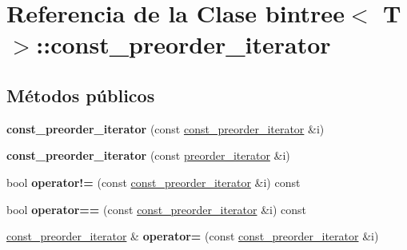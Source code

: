 \hypertarget{classbintree_1_1const__preorder__iterator}{}\section{Referencia de la Clase bintree$<$ T $>$\+:\+:const\+\_\+preorder\+\_\+iterator}
\label{classbintree_1_1const__preorder__iterator}
\subsection*{Métodos públicos}
\begin{DoxyCompactItemize}
\item 
{\bfseries const\+\_\+preorder\+\_\+iterator} (const \hyperlink{classbintree_1_1const__preorder__iterator}{const\+\_\+preorder\+\_\+iterator} \&i)\hypertarget{classbintree_1_1const__preorder__iterator_ad7e733eae6ff3c15876789e0a3ea5728}{}\label{classbintree_1_1const__preorder__iterator_ad7e733eae6ff3c15876789e0a3ea5728}

\item 
{\bfseries const\+\_\+preorder\+\_\+iterator} (const \hyperlink{classbintree_1_1preorder__iterator}{preorder\+\_\+iterator} \&i)\hypertarget{classbintree_1_1const__preorder__iterator_af32632713d464a9fbfa6d7bebc7e4d05}{}\label{classbintree_1_1const__preorder__iterator_af32632713d464a9fbfa6d7bebc7e4d05}

\item 
bool {\bfseries operator!=} (const \hyperlink{classbintree_1_1const__preorder__iterator}{const\+\_\+preorder\+\_\+iterator} \&i) const \hypertarget{classbintree_1_1const__preorder__iterator_a14451415df20b76c42f212ff62c8ba1b}{}\label{classbintree_1_1const__preorder__iterator_a14451415df20b76c42f212ff62c8ba1b}

\item 
bool {\bfseries operator==} (const \hyperlink{classbintree_1_1const__preorder__iterator}{const\+\_\+preorder\+\_\+iterator} \&i) const \hypertarget{classbintree_1_1const__preorder__iterator_a5378c460ff8159f21fcac315a3dc490c}{}\label{classbintree_1_1const__preorder__iterator_a5378c460ff8159f21fcac315a3dc490c}

\item 
\hyperlink{classbintree_1_1const__preorder__iterator}{const\+\_\+preorder\+\_\+iterator} \& {\bfseries operator=} (const \hyperlink{classbintree_1_1const__preorder__iterator}{const\+\_\+preorder\+\_\+iterator} \&i)\hypertarget{classbintree_1_1const__preorder__iterator_a7892239db01c504a435cac55d1de5188}{}\label{classbintree_1_1const__preorder__iterator_a7892239db01c504a435cac55d1de5188}


\end{DoxyCompactItemize}

